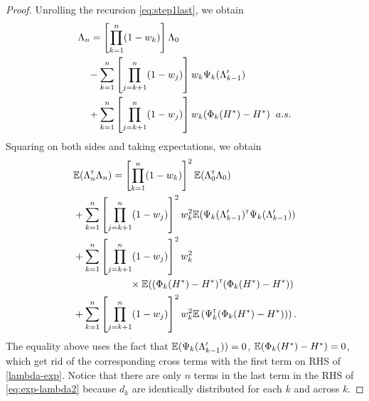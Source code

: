 \begin{proof}
Unrolling the recursion \eqref{eq:step1last}, we obtain 
 \begin{align}\label{lambda-exp}
&  \Lambda_n  = \left[ \prod_{k=1}^n (1-w_k) \right]\Lambda_0 \nonumber\\ 
&\quad- \sum_{k=1}^n \left[\prod_{j=k+1}^n (1-w_j)\right] w_k \Psi_k(\Lambda_{k-1}') \nonumber\\ 
&\quad+ \sum_{k=1}^n \left[\prod_{j=k+1}^n (1-w_j)\right] w_k (\Phi_k(H^*) - H^*) \hspace{0.2cm} a.s.
 \end{align}
Squaring on both sides and taking expectations, we obtain
 \begin{align}
 & \mathbb{E} (\Lambda_n ^\mathsf{\scriptscriptstyle T} \Lambda_n) =  \left[ \prod_{k=1}^n (1-w_k) \right]^2 \mathbb{E} (\Lambda_0 ^\mathsf{\scriptscriptstyle T} \Lambda_0)  \nonumber\\ &+ \sum_{k=1}^n \left[\prod_{j=k+1}^n (1-w_j)\right]^2 w_k^2   \mathbb{E} (\Psi_k(\Lambda_{k-1}') ^\mathsf{\scriptscriptstyle T} \Psi_k(\Lambda_{k-1}'))  \nonumber\\ &+ \sum_{k=1}^n \left[\prod_{j=k+1}^n (1-w_j)\right]^2 w_k^2  \nonumber\\& \hspace{2cm} \times \mathbb{E} ((\Phi_k(H^*) - H^*) ^\mathsf{\scriptscriptstyle T}  (\Phi_k(H^*) - H^*)) \nonumber\\
&+\sum_{k=1}^n \left[\prod_{j=k+1}^n (1-w_j)\right]^2 w_k^2 \mathbb{E}\left(\Psi_k ^\mathsf{\scriptscriptstyle T} (\Phi_k(H^*) - H^*))\right).\label{eq:exp-lambda2}
 \end{align}
The equality above uses the fact that $\mathbb{E}(\Psi_k(\Lambda_{k-1}'))=0$, $\mathbb{E}(\Phi_k(H^*) - H^*)=0$, which get rid of the corresponding cross terms with the first term on RHS of \eqref{lambda-exp}. Notice that there are only $n$ terms in the last term in the RHS of \eqref{eq:exp-lambda2} because $d_k$ are identically distributed for each $k$ and across $k$.  
 

\end{proof}
